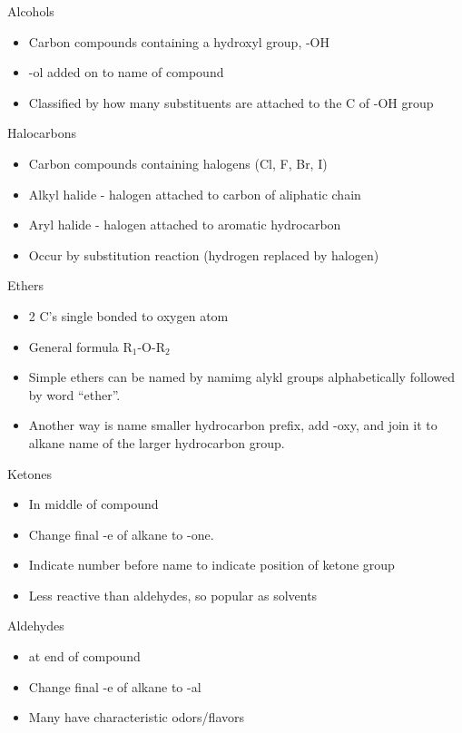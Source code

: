 \documentclass[../hchem.tex]{subfiles}
\begin{document}
Alcohols 
\begin{itemize}
    \item Carbon compounds containing a hydroxyl group, -OH 
    \item -ol added on to name of compound 
    \item Classified by how many substituents are attached to the C of -OH group 
\end{itemize}

Halocarbons 
\begin{itemize}
    \item Carbon compounds containing halogens (Cl, F, Br, I)
    \item Alkyl halide - halogen attached to carbon of aliphatic chain 
    \item Aryl halide - halogen attached to aromatic hydrocarbon 
    \item Occur by substitution reaction (hydrogen replaced by halogen)
\end{itemize}

Ethers
\begin{itemize}
    \item 2 C's single bonded to oxygen atom 
    \item General formula R$_1$-O-R$_2$ 
    \item Simple ethers can be named by namimg alykl groups alphabetically followed by word ``ether''. 
    \item Another way is name smaller hydrocarbon prefix, add -oxy, and join it to alkane name of the larger hydrocarbon group.
\end{itemize}

Ketones 
\begin{itemize}
    \item In middle of compound 
    \item Change final -e of alkane to -one.
    \item Indicate number before name to indicate position of ketone group 
    \item Less reactive than aldehydes, so popular as solvents 
\end{itemize}

Aldehydes 
\begin{itemize}
    \item at end of compound 
    \item Change final -e of alkane to -al 
    \item Many have characteristic odors/flavors 
\end{itemize}
\end{document}
